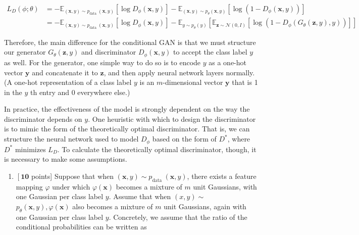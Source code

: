 \documentclass{article}
\theoremstyle{case}
\theoremstyle{definition}
\begin{document}
$$
\begin{aligned}
L_{D}(\phi ; \theta) & =-\mathbb{E}_{(\boldsymbol{x}, y) \sim p_{\text {data }}(\boldsymbol{x}, y)}\left[\log D_{\phi}(\boldsymbol{x}, y)\right]-\mathbb{E}_{(\boldsymbol{x}, y) \sim p_{\theta}(\boldsymbol{x}, y)}\left[\log \left(1-D_{\phi}(\boldsymbol{x}, y)\right)\right] \\
& =-\mathbb{E}_{(\boldsymbol{x}, y) \sim p_{\text {data }}(\boldsymbol{x}, y)}\left[\log D_{\phi}(\boldsymbol{x}, y)\right]-\mathbb{E}_{y \sim p_{\theta}(y)}\left[\mathbb{E}_{\boldsymbol{z} \sim \mathcal{N}(0, I)}\left[\log \left(1-D_{\phi}\left(G_{\theta}(\boldsymbol{z}, y), y\right)\right)\right]\right]
\end{aligned}
$$

Therefore, the main difference for the conditional GAN is that we must structure our generator $G_{\theta}(\boldsymbol{z}, y)$ and discriminator $D_{\phi}(\boldsymbol{x}, y)$ to accept the class label $y$ as well. For the generator, one simple way to do so is to encode $y$ as a one-hot vector $\boldsymbol{y}$ and concatenate it to $\boldsymbol{z}$, and then apply neural network layers normally. (A one-hot representation of a class label $y$ is an $m$-dimensional vector $\boldsymbol{y}$ that is 1 in the $y$ th entry and 0 everywhere else.)

In practice, the effectiveness of the model is strongly dependent on the way the discriminator depends on $y$. One heuristic with which to design the discriminator is to mimic the form of the theoretically optimal discriminator. That is, we can structure the neural network used to model $D_{\phi}$ based on the form of $D^{*}$, where $D^{*}$ minimizes $L_{D}$. To calculate the theoretically optimal discriminator, though, it is necessary to make some assumptions.

\begin{enumerate}
  \item $\left[\mathbf{1 0}\right.$ points] Suppose that when $(\boldsymbol{x}, y) \sim p_{\text {data }}(\boldsymbol{x}, y)$, there exists a feature mapping $\varphi$ under which $\varphi(\boldsymbol{x})$ becomes a mixture of $m$ unit Gaussians, with one Gaussian per class label $y$. Assume that when $(x, y) \sim$ $p_{\theta}(\boldsymbol{x}, y), \varphi(\boldsymbol{x})$ also becomes a mixture of $m$ unit Gaussians, again with one Gaussian per class label $y$. Concretely, we assume that the ratio of the conditional probabilities can be written as
\end{enumerate}
\end{document}
